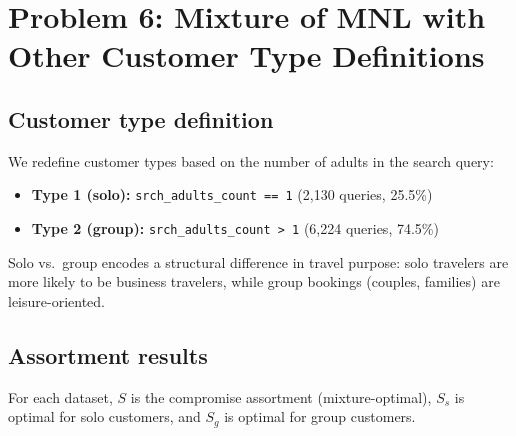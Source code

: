 \documentclass[11pt]{article}
\begin{document}
\section{Problem 6: Mixture of MNL with Other Customer Type Definitions}

\subsection*{Customer type definition}

We redefine customer types based on the number of adults in the search query:
\begin{itemize}
  \item \textbf{Type 1 (solo):} \texttt{srch\_adults\_count == 1} (2,130 queries, 25.5\%)
  \item \textbf{Type 2 (group):} \texttt{srch\_adults\_count > 1} (6,224 queries, 74.5\%)
\end{itemize}

Solo vs.\ group encodes a structural difference in travel purpose: solo travelers are more likely to be business travelers, while group bookings (couples, families) are leisure-oriented.

\subsection*{Assortment results}

For each dataset, $S$ is the compromise assortment (mixture-optimal), $S_s$ is optimal for solo customers, and $S_g$ is optimal for group customers.
\end{document}
